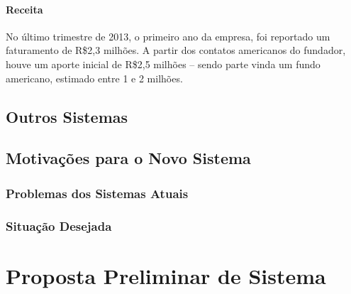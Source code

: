 \documentclass[12pt,a4paper,twoside,hyphens,english,brazil]{abntex2}
\begin{document}
\subsubsection*{Receita}
No último trimestre de 2013, o primeiro ano da empresa, foi reportado um faturamento de R\$2,3 milhões. A partir dos contatos americanos do fundador, houve um aporte inicial de R\$2,5 milhões -- sendo parte vinda um fundo americano, estimado entre 1 e 2 milhões.\cite{ingresse-hypeness}

\section{Outros Sistemas} \label{sec:sistemas:outros}

\section{Motivações para o Novo Sistema}

\subsection{Problemas dos Sistemas Atuais}

\subsection{Situação Desejada}

\chapter{Proposta Preliminar de Sistema}

\end{document}
